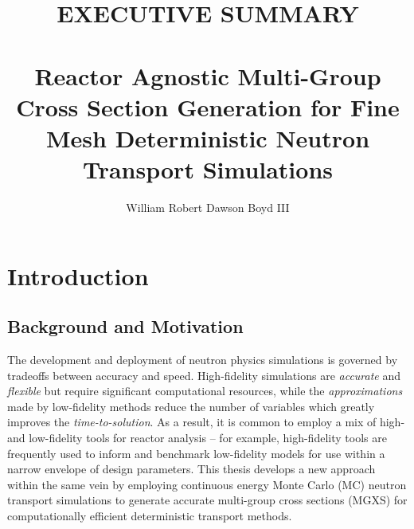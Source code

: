 \documentclass[12pt,twoside]{mitthesis-exec}
\begin{document}

\title{EXECUTIVE SUMMARY \\~\\ Reactor Agnostic Multi-Group Cross Section Generation for Fine Mesh Deterministic Neutron Transport Simulations}

\author{William Robert Dawson Boyd III}





\setcounter{savepage}{\thepage}



\singlespacing 

\section*{Introduction}

\subsection*{Background and Motivation}

The development and deployment of neutron physics simulations is governed by tradeoffs between accuracy and speed. High-fidelity simulations are \textit{accurate} and \textit{flexible} but require significant computational resources, while the \textit{approximations} made by low-fidelity methods reduce the number of variables which greatly improves the \textit{time-to-solution}. As a result, it is common to employ a mix of high- and low-fidelity tools for reactor analysis -- for example, high-fidelity tools are frequently used to inform and benchmark low-fidelity models for use within a narrow envelope of design parameters. This thesis develops a new approach within the same vein by employing continuous energy Monte Carlo (MC) neutron transport simulations to generate accurate multi-group cross sections (MGXS) for computationally efficient deterministic transport methods.
\end{document}
